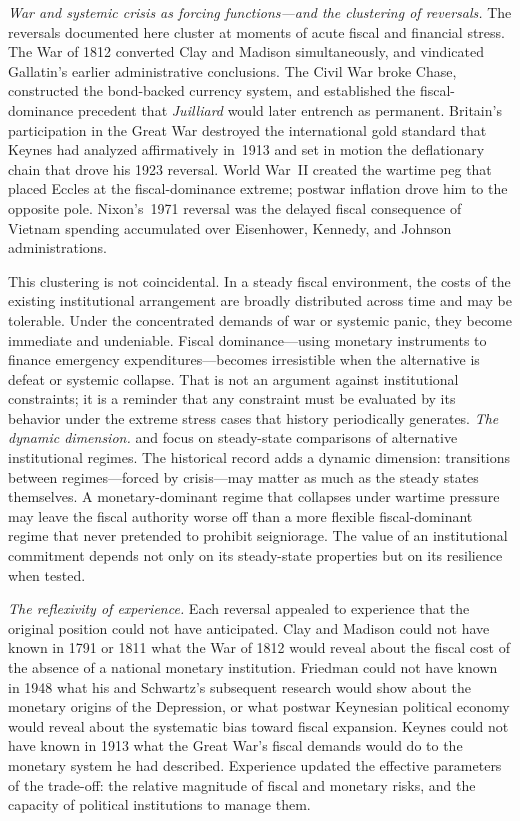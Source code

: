 \documentclass[12pt]{article}
\begin{document}
\textit{War and systemic crisis as forcing functions---and the clustering
of reversals.}  The reversals documented here cluster at moments of acute
fiscal and financial stress.  The War of 1812 converted Clay and Madison
simultaneously, and vindicated Gallatin's earlier administrative
conclusions.  The Civil War broke Chase, constructed the bond-backed
currency system, and established the fiscal-dominance precedent that
\textit{Juilliard} would later entrench as permanent.  Britain's
participation in the Great War destroyed the international gold standard
that Keynes had analyzed affirmatively in~1913 and set in motion the
deflationary chain that drove his 1923 reversal.  World War~II created
the wartime peg that placed Eccles at the fiscal-dominance extreme;
postwar inflation drove him to the opposite pole.  Nixon's~1971 reversal
was the delayed fiscal consequence of Vietnam spending accumulated over
Eisenhower, Kennedy, and Johnson administrations.

This clustering is not coincidental.  In a steady fiscal environment,
the costs of the existing institutional arrangement are broadly distributed
across time and may be tolerable.  Under the concentrated demands of war
or systemic panic, they become immediate and undeniable.  Fiscal
dominance---using monetary instruments to finance emergency
expenditures---becomes irresistible when the alternative is defeat or
systemic collapse.  That is not an argument against institutional
constraints; it is a reminder that any constraint must be evaluated by
its behavior under the extreme stress cases that history periodically
generates.
\textit{The dynamic dimension.}
\citet{SargentWallace1981} and \citet{Sargent2011} focus on steady-state
comparisons of alternative institutional regimes.  The historical record
adds a dynamic dimension: transitions between regimes---forced by
crisis---may matter as much as the steady states themselves.  A
monetary-dominant regime that collapses under wartime pressure may leave
the fiscal authority worse off than a more flexible fiscal-dominant regime
that never pretended to prohibit seigniorage.  The value of an
institutional commitment depends not only on its steady-state properties
but on its resilience when tested.

\textit{The reflexivity of experience.}  Each reversal appealed to
experience that the original position could not have anticipated.  Clay
and Madison could not have known in 1791 or 1811 what the War of 1812
would reveal about the fiscal cost of the absence of a national monetary
institution.  Friedman could not have known in 1948 what his and
Schwartz's subsequent research would show about the monetary origins of
the Depression, or what postwar Keynesian political economy would reveal
about the systematic bias toward fiscal expansion.  Keynes could not
have known in 1913 what the Great War's fiscal demands would do to the
monetary system he had described.  Experience updated the effective
parameters of the trade-off: the relative magnitude of fiscal and
monetary risks, and the capacity of political institutions to manage them.
\end{document}
